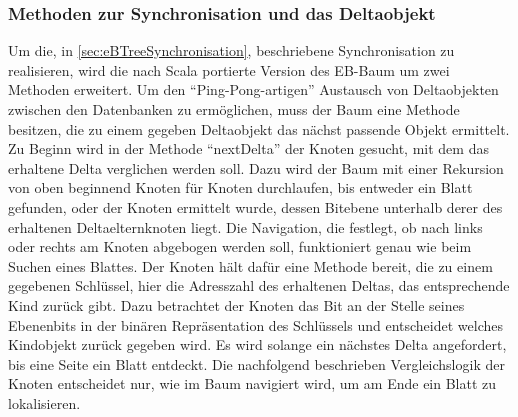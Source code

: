 \documentclass[a4paper,11pt,oneside,%
headsepline,												%
footsepline,												%
bibtotocnumbered									%
]{scrreprt}
\begin{document}
\subsubsection{Methoden zur Synchronisation und das Deltaobjekt}
Um die, in \autoref{sec:eBTreeSynchronisation}, beschriebene Synchronisation zu realisieren, wird die nach Scala portierte Version des \ac{EB-Baum} um zwei Methoden erweitert. Um den \enquote{Ping-Pong-artigen} Austausch von Deltaobjekten zwischen den Datenbanken zu ermöglichen, muss der Baum eine Methode besitzen, die zu einem gegeben Deltaobjekt das nächst passende Objekt ermittelt. Zu Beginn wird in der Methode \enquote{nextDelta} der Knoten gesucht, mit dem das erhaltene Delta verglichen werden soll. Dazu wird der Baum mit einer Rekursion von oben beginnend Knoten für Knoten durchlaufen, bis entweder ein Blatt gefunden, oder der Knoten ermittelt wurde, dessen Bitebene unterhalb derer des erhaltenen Deltaelternknoten liegt. Die Navigation, die festlegt, ob nach links oder rechts am Knoten abgebogen werden soll, funktioniert genau wie beim Suchen eines Blattes. Der Knoten hält dafür eine Methode bereit, die zu einem gegebenen Schlüssel, hier die Adresszahl des erhaltenen Deltas, das entsprechende Kind zurück gibt. Dazu betrachtet der Knoten das Bit an der Stelle seines Ebenenbits in der binären Repräsentation des Schlüssels und entscheidet welches Kindobjekt zurück gegeben wird. Es wird solange ein nächstes Delta angefordert, bis eine Seite ein Blatt entdeckt. Die nachfolgend beschrieben Vergleichslogik der Knoten entscheidet nur, wie im Baum navigiert wird, um am Ende ein Blatt zu lokalisieren.\\
\end{document}
